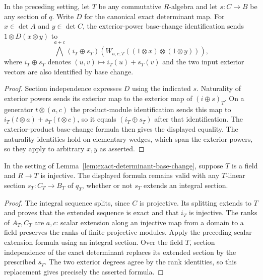 \begin{lemma}
\label{lem:exact-determinant-base-change}
\leanok
In the preceding setting, let $T$ be any commutative $R$-algebra and
let $s:C\to B$ be any section of $q$. Write $D$ for the canonical exact
determinant map. For $x\in\det A$ and $y\in\det C$, the exterior-power
base-change identification sends $1\otimes D(x\otimes y)$ to
\[
 \bigwedge^{a+c}(i_T\mathbin{\oplus}s_T)
 \left(W_{a,c,T}((1\otimes x)\otimes(1\otimes y))\right),
\]
where $i_T\mathbin{\oplus}s_T$ denotes $(u,v)\mapsto i_T(u)+s_T(v)$
and the two input exterior vectors are also identified by base change.
\end{lemma}
\begin{proof}
Section independence expresses $D$ using the indicated $s$.
Naturality of exterior powers sends its exterior map to the exterior map
of $(i\mathbin{\oplus}s)_T$. On a generator $t\otimes(a,c)$ the
product-module identification sends this map to
$i_T(t\otimes a)+s_T(t\otimes c)$, so it equals
$(i_T\mathbin{\oplus}s_T)$ after that identification.
The exterior-product base-change formula then gives the displayed equality.
The naturality identities hold on elementary wedges, which span the
exterior powers, so they apply to arbitrary $x,y$ as asserted.
\end{proof}

\begin{lemma}
\label{lem:exact-determinant-field-section}
\leanok
In the setting of Lemma~\ref{lem:exact-determinant-base-change}, suppose
$T$ is a field and $R\to T$ is injective. The displayed formula remains
valid with any $T$-linear section $s_T:C_T\to B_T$ of $q_T$, whether
or not $s_T$ extends an integral section.
\end{lemma}
\begin{proof}
The integral sequence splits, since $C$ is projective. Its splitting
extends to $T$ and proves that the extended sequence is exact and that
$i_T$ is injective. The ranks of $A_T,C_T$ are $a,c$: scalar extension
along an injective map from a domain to a field preserves the ranks of
finite projective modules. Apply the preceding scalar-extension formula
using an integral section. Over the field $T$, section independence of
the exact determinant replaces its extended section by the prescribed
$s_T$. The two exterior degrees agree by the rank identities, so this
replacement gives precisely the asserted formula.
\end{proof}

